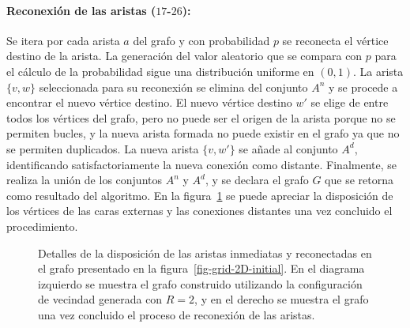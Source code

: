 \paragraph{Reconexi\'on de las aristas ($17$-$26$):} Se itera por cada arista $a$ del grafo y con probabilidad $p$ se reconecta el v\'ertice destino de la arista. La generaci\'on del valor aleatorio que se compara con $p$ para el c\'alculo de la probabilidad sigue una distribuci\'on uniforme en $(0,1)$. La arista $\lbrace v,w \rbrace$ seleccionada para su reconexi\'on se elimina del conjunto $A^n$ y se procede a encontrar el nuevo v\'ertice destino. El nuevo v\'ertice destino $w'$ se elige de entre todos los v\'ertices del grafo, pero no puede ser el origen de la arista porque no se permiten bucles, y la nueva arista formada no puede existir en el grafo ya que no se permiten duplicados. La nueva arista $\lbrace v,w' \rbrace$ se a\~nade al conjunto $A^d$, identificando satisfactoriamente la nueva conexi\'on como distante. Finalmente, se realiza la uni\'on de los conjuntos $A^n$ y $A^d$, y se declara el grafo $G$ que se retorna como resultado del algoritmo. En la figura~\ref{fig-grid-2D-reconected} se puede apreciar la disposici\'on de los v\'ertices de las caras externas y las conexiones distantes una vez concluido el procedimiento.

\begin{figure}[!ht]
\begin{center}
\end{center}\vspace*{-0.6cm}
\caption[Detalles de la disposici\'on de las aristas inmediatas y reconectadas en el grafo]{Detalles de la disposici\'on de las aristas inmediatas y reconectadas en el grafo presentado en la figura~\ref{fig-grid-2D-initial}. En el diagrama izquierdo se muestra el grafo construido utilizando la configuraci\'on de vecindad generada con $R=2$, y en el derecho se muestra el grafo una vez concluido el proceso de reconexi\'on de las aristas.}
\label{fig-grid-2D-reconected}
\end{figure}

